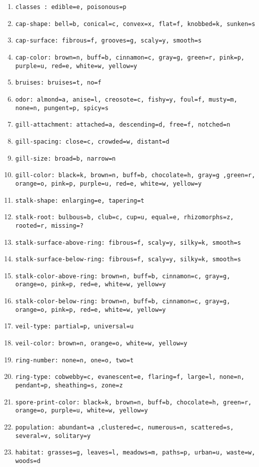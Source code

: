 \begin{enumerate}
	\item \texttt{classes : edible=e, poisonous=p}
	\item \texttt{cap-shape: bell=b, conical=c, convex=x, flat=f, knobbed=k, sunken=s}
	\item \texttt{cap-surface: fibrous=f, grooves=g, scaly=y, smooth=s}
	\item \texttt{cap-color: brown=n, buff=b, cinnamon=c, gray=g, green=r, pink=p, purple=u, red=e, white=w, yellow=y}
	\item \texttt{bruises: bruises=t, no=f}
	\item \texttt{odor: almond=a, anise=l, creosote=c, fishy=y, foul=f, musty=m, none=n, pungent=p, spicy=s}
	\item \texttt{gill-attachment: attached=a, descending=d, free=f, notched=n}
	\item \texttt{gill-spacing: close=c, crowded=w, distant=d}
	\item \texttt{gill-size: broad=b, narrow=n}
	\item \texttt{gill-color: black=k, brown=n, buff=b, chocolate=h, gray=g ,green=r, orange=o, pink=p, purple=u, red=e, white=w, yellow=y}
	\item \texttt{stalk-shape: enlarging=e, tapering=t}
	\item \texttt{stalk-root: bulbous=b, club=c, cup=u, equal=e, rhizomorphs=z, rooted=r, missing=?}
	\item \texttt{stalk-surface-above-ring: fibrous=f, scaly=y, silky=k, smooth=s}
	\item \texttt{stalk-surface-below-ring: fibrous=f, scaly=y, silky=k, smooth=s}
	\item \texttt{stalk-color-above-ring: brown=n, buff=b, cinnamon=c, gray=g, orange=o, pink=p, red=e, white=w, yellow=y}
	\item \texttt{stalk-color-below-ring: brown=n, buff=b, cinnamon=c, gray=g, orange=o, pink=p, red=e, white=w, yellow=y}
	\item \texttt{veil-type: partial=p, universal=u}
	\item \texttt{veil-color: brown=n, orange=o, white=w, yellow=y}
	\item \texttt{ring-number: none=n, one=o, two=t}
	\item \texttt{ring-type: cobwebby=c, evanescent=e, flaring=f, large=l, none=n, pendant=p, sheathing=s, zone=z}
	\item \texttt{spore-print-color: black=k, brown=n, buff=b, chocolate=h, green=r, orange=o, purple=u, white=w, yellow=y}
	\item \texttt{population: abundant=a ,clustered=c, numerous=n, scattered=s, several=v, solitary=y}
	\item \texttt{habitat: grasses=g, leaves=l, meadows=m, paths=p, urban=u, waste=w, woods=d}
\end{enumerate}


